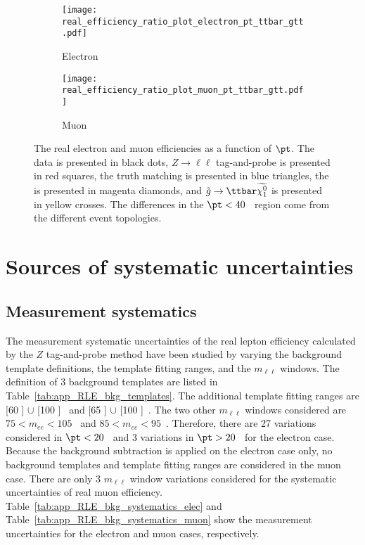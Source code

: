 \begin{figure}[htb]
    \begin{subfigure}[b]{0.48\textwidth}
        \begin{center}
            \texttt{[image: real\_efficiency\_ratio\_plot\_electron\_pt\_ttbar\_gtt.pdf]}
            \caption{Electron}
        \end{center}
    \end{subfigure}
    \begin{subfigure}[b]{0.48\textwidth}
        \begin{center}
            \texttt{[image: real\_efficiency\_ratio\_plot\_muon\_pt\_ttbar\_gtt.pdf]}
            \caption{Muon}
        \end{center}
    \end{subfigure}
    \caption{The real electron and muon efficiencies as a function of $\pt$.
    The data is presented in black dots,  $Z\to \ell\ell$ tag-and-probe is presented in red squares, the truth matching is presented in blue triangles, the \ttbar is presented in magenta diamonds, and $\tilde{g} \to \ttbar \widetilde{\chi^{0}_{1}}$ is presented in yellow crosses.
    The differences in the $\pt < 40$~{\GeV} region come from the different event topologies.}
    \label{fig:app_RLE_real_efficiency_ttbar_gtt}
\end{figure}


\section{Sources of systematic uncertainties}
\label{sec:app_RLE_sources_of_systematic_uncertainties}


\subsection{Measurement systematics}
\label{subsec:app_RLE_bkg_systematics}
The measurement systematic uncertainties of the real lepton efficiency calculated by the $Z$ tag-and-probe method have been studied by varying the background template definitions, the template fitting ranges, and the $m_{\ell \ell}$ windows.
The definition of 3 background templates are listed in Table~\ref{tab:app_RLE_bkg_templates}.
The additional template fitting ranges are [60 ] $\cup$ [100 ]~{\GeV} and [65 ] $\cup$ [100 ]~{\GeV}.
The two other $m_{\ell \ell}$ windows considered are $75 < m_{ee} < 105$~{\GeV} and $85 < m_{ee} < 95$~{\GeV}.
Therefore, there are 27 variations considered in $\pt < 20$~{\GeV} and 3 variations in $\pt > 20$~{\GeV} for the electron case.
Because the background subtraction is applied on the electron case only, no background templates and template fitting ranges are considered in the muon case.
There are only 3 $m_{\ell \ell}$ window variations considered for the systematic uncertainties of real muon efficiency.
Table~\ref{tab:app_RLE_bkg_systematics_elec} and Table~\ref{tab:app_RLE_bkg_systematics_muon} show the measurement uncertainties for the electron and muon cases, respectively.

